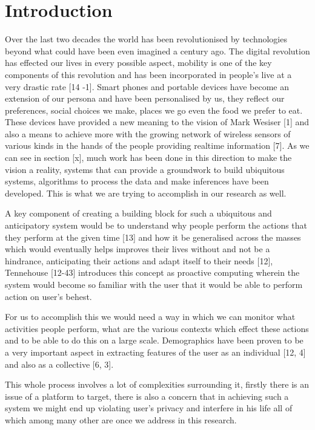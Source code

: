 \documentclass[12pt]{report}
\begin{document}
\section{Introduction}
Over the last two decades the world has been revolutionised by technologies beyond what could have been even imagined a century ago. The digital revolution has effected our lives in every possible aspect, mobility is one of the key components of this revolution and has been incorporated in people's live at a very drastic rate [14 -1]. Smart phones and portable devices have become an extension of our persona and have been personalised by us, they reflect our preferences, social choices we make, places we go even the food we prefer to eat. These devices have provided a new meaning to the vision of Mark Wesiser [1] and also a means to achieve more with the growing network of wireless sensors of various kinds in the hands of the people providing realtime information [7]. As we can see in section [x], much work has been done in this direction to make the vision a reality, systems that can provide a groundwork to build ubiquitous systems, algorithms to process the data and make inferences have been developed. This is what we are trying to accomplish in our research as well.

A key component of creating a building block for such a ubiquitous and anticipatory system would be to understand why people perform the actions that they perform at the given time [13] and how it be generalised across the masses which would eventually helps improves their lives without and not be a hindrance, anticipating their actions and adapt itself to their needs [12], Tennehouse [12-43] introduces this concept as proactive computing wherein the system would become so familiar with the user that it would be able to perform action on user's behest.

For us to accomplish this we would need a way in which we can monitor what activities people perform, what are the various contexts which effect these actions and to be able to do this on a large scale. Demographics have been proven to be a very important aspect in extracting features of the user as an individual [12, 4] and also as a collective [6, 3].

This whole process involves a lot of complexities surrounding it, firstly there is an issue of a platform to target, there is also a concern that in achieving such a system we might end up violating user's privacy and interfere in his life all of which among many other are once we address in this research.
\end{document}
